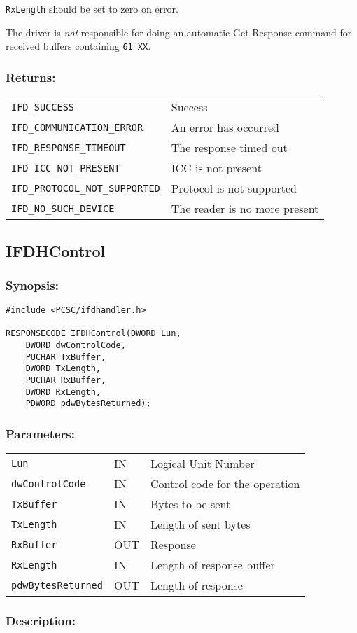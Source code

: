 \documentclass[a4paper,12pt]{article}
\newcommand{\synopsis}{\subsubsection{Synopsis:}}
\newcommand{\parameters}{\subsubsection{Parameters:}}
\newcommand{\desc}{\subsubsection{Description:}}
\newcommand{\returns}{\subsubsection{Returns:}}
\begin{document}
\texttt{RxLength} should be set to zero on error.

The driver is \emph{not} responsible for doing an automatic Get Response
command for received buffers containing \texttt{61 XX}.

\returns

\begin{tabular}{ll}
\texttt{IFD\_SUCCESS} & Success\\
\texttt{IFD\_COMMUNICATION\_ERROR} & An error has occurred\\
\texttt{IFD\_RESPONSE\_TIMEOUT} & The response timed out\\
\texttt{IFD\_ICC\_NOT\_PRESENT} & ICC is not present\\
\texttt{IFD\_PROTOCOL\_NOT\_SUPPORTED} & Protocol is not supported\\
\texttt{IFD\_NO\_SUCH\_DEVICE} & The reader is no more present\\
\end{tabular}


\subsection{IFDHControl}
\label{IFDHControl}

\synopsis
\begin{verbatim}
#include <PCSC/ifdhandler.h>

RESPONSECODE IFDHControl(DWORD Lun,
    DWORD dwControlCode,
    PUCHAR TxBuffer,
    DWORD TxLength,
    PUCHAR RxBuffer,
    DWORD RxLength,
    PDWORD pdwBytesReturned);
\end{verbatim}

\parameters

\begin{tabular}{lll}
\texttt{Lun} & IN & Logical Unit Number\\
\texttt{dwControlCode} & IN & Control code for the operation\\
\texttt{TxBuffer} & IN & Bytes to be sent\\
\texttt{TxLength} & IN & Length of sent bytes\\
\texttt{RxBuffer} & OUT & Response\\
\texttt{RxLength} & IN & Length of response buffer\\
\texttt{pdwBytesReturned} & OUT & Length of response \\
\end{tabular}

\desc
\end{document}
